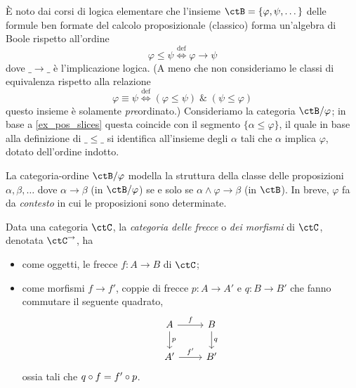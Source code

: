 \begin{example}\label{ex_boole_cpc}
	\`E noto dai corsi di logica elementare che l'insieme \(\ctB=\{\varphi,\psi,\dots\}\) delle formule ben formate del calcolo proposizionale (classico) forma un'algebra di Boole rispetto all'ordine
	\[\varphi\le\psi \overset{\text{def}}\iff \varphi \to \psi\]
	dove \(\_\to\_\) è l'implicazione logica. (A meno che non consideriamo le classi di equivalenza rispetto alla relazione
	\[\varphi\equiv\psi \overset{\text{def}}\iff (\varphi\le \psi) \; \& \; (\psi\le\varphi)\]
	questo insieme è solamente \emph{pre}ordinato.) Consideriamo la categoria \(\ctB/\varphi\); in base a \ref{ex_pos_slices} questa coincide con il segmento \(\{\alpha\le\varphi\}\), il quale in base alla definizione di \(\_\le\_\) si identifica all'insieme degli \(\alpha\) tali che \(\alpha\) implica \(\varphi\), dotato dell'ordine indotto.

	La categoria-ordine \(\ctB/\varphi\) modella la struttura della classe delle proposizioni \(\alpha,\beta,\dots\) dove \(\alpha \to \beta\) (in \(\ctB/\varphi\)) se e solo se \(\alpha \land \varphi \to \beta\) (in \(\ctB\)). In breve, $\varphi$ fa da \emph{contesto} in cui le proposizioni sono determinate.
\end{example}
\begin{definition}\label{def_cat_frecce}
	Data una categoria \(\ctC\), la \emph{categoria delle frecce} o \emph{dei morfismi} di \(\ctC\), denotata $\ctC^\to$, ha
	\begin{itemize}
		\item come oggetti, le frecce \(f:A\to B\) di \(\ctC\);
		\item come morfismi \(f\to f'\), coppie di frecce \(p:A\to A'\) e \(q:B\to B'\) che fanno commutare il seguente quadrato,
		      \[
			      \begin{tikzcd}
				      A \ar{r}{f} \ar{d}{p} & B \ar{d}{q} \\
				      A' \ar{r}{f'} & B'
			      \end{tikzcd}
		      \]
		      ossia tali che \(q\circ f=f'\circ p\).
	\end{itemize}
\end{definition}

